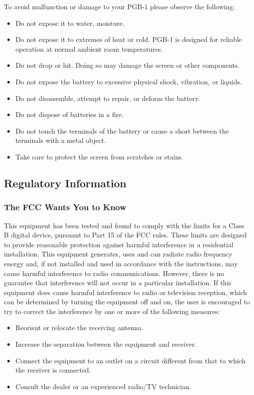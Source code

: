\documentclass[8pt]{extarticle}
\begin{document}
\begin{multicols*}{3}
To avoid malfunction or damage to your PGB-1 please observe the following:
\begin{itemize}
\item Do not expose it to water, moisture.
\item Do not expose it to extremes of heat or cold. PGB-1 is designed for reliable operation at normal ambient room temperatures.
\item Do not drop or hit. Doing so may damage the screen or other components.
\item Do not expose the battery to excessive physical shock, vibration, or liquids.
\item Do not disassemble, attempt to repair, or deform the battery.
\item Do not dispose of batteries in a fire.
\item Do not touch the terminals of the battery or cause a short between the terminals with a metal object.
\item Take care to protect the screen from scratches or stains.
\end{itemize}

\subsection{Regulatory Information}

\subsubsection{The FCC Wants You to Know}

This equipment has been tested and found to comply with the limits for a Class B digital device, pursuant to Part 15 of the FCC rules. These limits are designed to provide reasonable protection against harmful
interference in a residential installation. This equipment generates, uses and can radiate radio frequency
energy and, if not installed and used in accordance with the instructions, may cause harmful interference to radio communications. However, there is no guarantee that interference will not occur in a particular
installation. If this equipment does cause harmful interference to radio or television reception, which can be determined by turning the equipment off and on, the user is encouraged to try to correct the interference by one or more of the following measures:
\begin{itemize}
\item Reorient or relocate the receiving antenna.
\item Increase the separation between the equipment and receiver.
\item Connect the equipment to an outlet on a circuit different from that to which the receiver is connected.
\item Consult the dealer or an experienced radio/TV technician.
\end{itemize}


\end{multicols*}
\end{document}
